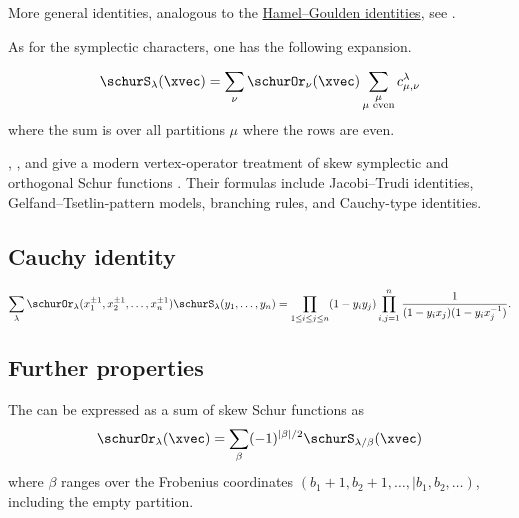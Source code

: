 More general identities, analogous to the
\hyperref[schurStripDecompFormula]{Hamel--Goulden identities}, see
\cite{Hamel1997}.



As for the symplectic characters, one has the following expansion.
\begin{theorem}[Littlewood]
\[
\schurS_{\lambda}(\xvec)
= \sum_{\nu} \schurOr_\nu(\xvec)
  \sum_{\substack{\mu\\ \mu \text{ even}}} c^{\lambda}_{\mu,\nu}
\]
where the sum is over all partitions $\mu$ where the rows are even.
\end{theorem}


, , and  give a modern
vertex-operator treatment of skew symplectic and orthogonal Schur functions
\cite{JingLiWang2024}.  Their formulas include Jacobi--Trudi identities,
Gelfand--Tsetlin-pattern models, branching rules, and Cauchy-type identities.
%
%



\subsection[schurOrthogonalCauchy]{Cauchy identity}

\[
\sum_{\lambda} \schurOr_\lambda(x^{\pm 1}_{1},x^{\pm 1}_{2},\dotsc, x^{\pm 1}_{n}) \schurS_\lambda(y_1,\dotsc,y_n)
=
\prod_{1\leq i \leq j \leq n} (1-y_i y_j)
\prod_{i,j=1}^{n} \frac{1}{(1-y_i x_j)(1-y_i x^{-1}_j)}.
\]

\subsection[schurOrthogonalOtherProperties]{Further properties}

The \label{orthogonalSchurFunction} can be
expressed as a sum of skew Schur functions as
\[
\schurOr_\lambda(\xvec) = \sum_\beta (-1)^{|\beta|/2} \schurS_{\lambda/\beta}(\xvec)
\]
where $\beta$ ranges over the Frobenius coordinates $(b_1+1,b_2+1,\dotsc, | b_1,b_2,\dotsc)$,
including the empty partition.
